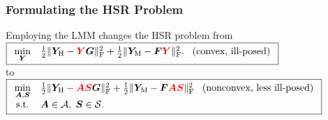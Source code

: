 \documentclass[10pt,mathserif]{beamer}
\newcommand{\YH}{\bm Y_\text H}
\newcommand{\YM}{\bm Y_\text M}
\newcommand{\Fr}{_\text F}
\begin{document}
    \begin{frame}
        \frametitle{Formulating the HSR Problem}
        Employing the LMM changes the HSR problem from \\
        \vspace{0.4cm}
        $\boxed{
             \begin{array}{cl}
                 \underset{\bm Y}{\min}
                 &
                 \frac{1}{2} \Vert \YH - {\textcolor{red}{\bm Y}} \bm G \Vert\Fr^2 +
                 \frac{1}{2} \Vert \YM - \bm F {\textcolor{red}{\bm Y}} \Vert\Fr^2.
                 \;\;\; \text{(convex, ill-posed)}
             \end{array}
         }$ \\
        \vspace{0.4cm}
        to \\
        \vspace{0.4cm}
        $\boxed{
             \begin{array}{cl}
                 \underset{\bm A,\bm S}{\min}
                 &
                 \frac{1}{2} \Vert \YH - \textcolor{red}{\bm A \bm S} \bm G \Vert\Fr^2 +
                 \frac{1}{2} \Vert \YM - \bm F \textcolor{red}{\bm A \bm S} \Vert\Fr^2
                 \;\;\; \text{(nonconvex, less ill-posed)} \\
                 \text{s.t.}
                 &
                 \bm A \in \mathcal A,\;\bm S \in \mathcal S.
             \end{array}
         }$ \\
         \vspace{0.4cm}
    \end{frame}
\end{document}
